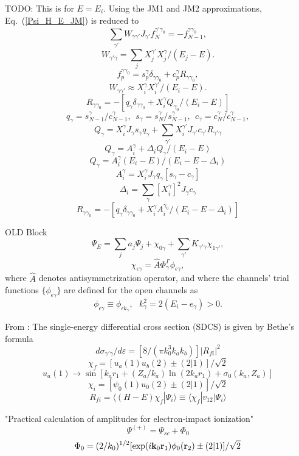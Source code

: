 \documentclass[aip
, pra
, showpacs
, aps
, twocolumn
, groupedaddress
, floatfix
]{revtex4}
\newcommand{\beq}{\begin{equation}}
\newcommand{\eeq}{\end{equation}}
\begin{document}
\newpage
TODO: This is for $E=E_i$.
Using the JM1 and JM2 approximations, Eq.~(\ref{Psi_H_E_JM}) is reduced to
\beq 
\sum_{\gamma'} W_{\gamma \gamma'} J_{\gamma'} f^{\gamma' \gamma_0}_N
= - f_{N-1}^{\gamma \gamma_0} ,
\eeq
\beq
W_{\gamma' \gamma}= \sum_j  X_j^{\gamma'} X_j^{\gamma} / (E_j-E).
\eeq
\beq
f^{\gamma \gamma_0}_{p} =  s_{p}^{\gamma} \delta_{\gamma \gamma_0}
+ c_{p}^{\gamma} R_{\gamma \gamma_0}, 
\eeq
\beq
W_{\gamma \gamma'} \approx  X_i^{\gamma} X_i^{\gamma'} / (E_i-E).
\eeq
\beq
R_{\gamma \gamma_0} =  -
[ q_{\gamma} \delta_{\gamma \gamma_0} + X_i^{\gamma} Q_{\gamma_0} / (E_i-E)]
\eeq
\beq
q_{\gamma} = s_{N-1}^{\gamma} / c_{N-1}^{\gamma}, \ \ 
s_{\gamma} = s_N^{\gamma} / s_{N-1}^{\gamma}, \ \ 
c_{\gamma} = c_N^{\gamma} / c_{N-1}^{\gamma}, 
\eeq
\beq
Q_{\gamma} =  X_i^{\gamma} J_{\gamma} s_{\gamma} q_\gamma +
\sum_{\gamma'} X_i^{\gamma'} J_{\gamma'} c_{\gamma'} R_{\gamma' \gamma}
\eeq
\beq
Q_{\gamma} = A_i^\gamma  + \Delta_i Q_\gamma / (E_i-E)
\eeq
\beq
Q_{\gamma} = A_i^\gamma  (E_i-E)/ (E_i-E - \Delta_i)
\eeq
\beq
A_i^\gamma =
X_i^{\gamma} J_{\gamma} q_\gamma [s_{\gamma} -c_{\gamma} ]
\eeq
\beq
\Delta_i = \sum_{\gamma} [X_i^{\gamma}]^2 J_{\gamma} c_{\gamma}
\eeq
\beq
R_{\gamma \gamma_0} =  -
[ q_{\gamma} \delta_{\gamma \gamma_0} + X_i^{\gamma} A_i^{\gamma_0} / (E_i-E - \Delta_i)]
\eeq



OLD Block
\beq
 \Psi_{E}  =  \sum_j a_j \Psi_j + \chi_{0 \gamma}
+ \sum_{\gamma'}   K_{\gamma' \gamma}
\chi_{1 \gamma'} ,
\eeq
\beq
\chi_{\epsilon \gamma} = \hat{A} \Phi^\Gamma_{\gamma}  \phi_{\epsilon \gamma},
\eeq
where $\hat{A}$ denotes antisymmetrization operator,
and where the channels' trial functions $\{ \phi_{\epsilon \gamma} \}$ are defined for the open channels as
\beq
\phi_{\epsilon \gamma}\equiv \phi_{\epsilon k_\gamma}, \ \ \   k_{\gamma}^2 = 2(E_i - e_\gamma) > 0.
\eeq


From \cite{HZ11}:
The single-energy differential cross section (SDCS) is given by Bethe's formula
\beq
d\sigma_{\gamma' \gamma} / d \varepsilon = [8/(\pi k_0^3 k_a k_b)] |R_{fi}|^2
\eeq
\beq
\chi_f = [u_a(1) u_b(2) \pm (2|1)] /\sqrt{2}
\eeq
\beq
u_a(1) \rightarrow \sin[k_a r_1 + (Z_a/k_a) \ln(2k_a r_1) + \sigma_0(k_a, Z_a)]
\eeq
\beq
\chi_i = [\psi_0(1) u_0(2) \pm (2|1)] /\sqrt{2}
\eeq
\beq
R_{fi} = \langle (H-E) \chi_f | \Psi_i \rangle \equiv \langle \chi_f | v_{12}|\Psi_i \rangle
\eeq


"Practical calculation of amplitudes for electron-impact ionization" \cite{MHR01}
\beq
\Psi^{(+)} = \Psi_{sc}+ \Phi_0
\eeq
\beq
\Phi_0 = (2/k_0)^{1/2}[\exp(i{\bf k}_0 {\bf r}_1) \phi_0({\bf r}_2) \pm (2|1)] / \sqrt{2}
\eeq
\end{document}
